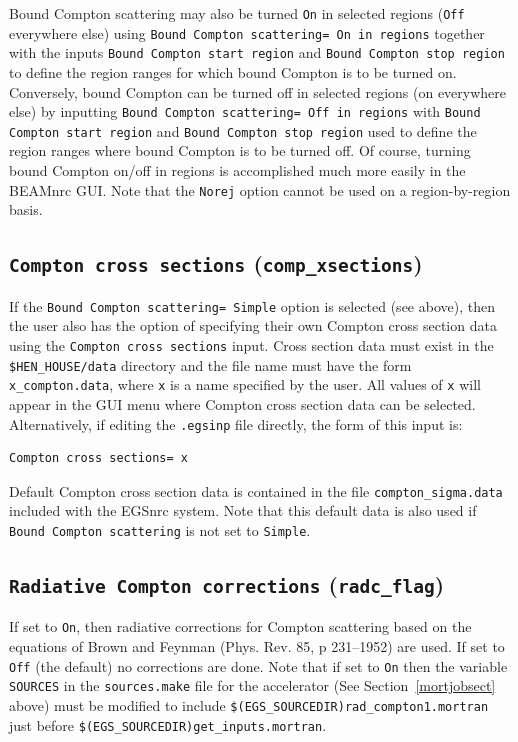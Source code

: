\documentclass[12pt,twoside]{article}
\begin{document}
Bound Compton scattering may also be turned {\tt On} in selected regions
({\tt Off} everywhere else) using
{\tt  Bound Compton scattering= On in regions} together with
the inputs {\tt Bound Compton start region} and {\tt Bound Compton stop region}
to define the region ranges for which bound Compton is to be turned on.
Conversely, bound Compton can be turned off in selected regions
(on everywhere else) by inputting
{\tt  Bound Compton scattering= Off in regions} with
{\tt Bound Compton start region} and {\tt Bound Compton stop region} used
to define the region ranges where bound Compton is to be turned off.  Of
course, turning bound Compton on/off in regions is accomplished much more
easily in the BEAMnrc GUI.  Note that the {\tt Norej} option cannot be
used on a region-by-region basis.

\subsection{ {\tt Compton cross sections} ({\tt comp\_xsections})}

If the {\tt Bound Compton scattering= Simple} option is selected (see above), then
the user also has the option of
specifying their own Compton cross section data
using the {\tt Compton cross sections} input.  Cross section data must exist
in the {\tt \$HEN\_HOUSE/data} directory and the file name must have
the form {\tt x\_compton.data}, where {\tt x} is a name
specified by the user.  All values of {\tt x} will appear in the GUI menu where Compton
cross section data can be selected.  Alternatively, if editing
the {\tt .egsinp} file directly, the form of this input is:
\begin{verbatim}
Compton cross sections= x
\end{verbatim}
Default Compton cross section
data is contained in the file {\tt compton\_sigma.data} included with
the EGSnrc system. Note that this default data is also used
if {\tt Bound Compton scattering} is not set to {\tt Simple}.

\subsection{{\tt Radiative Compton corrections} ({\tt radc\_flag})}

If set to {\tt On}, then radiative
corrections for Compton scattering based on the equations
of Brown and Feynman (Phys. Rev. 85, p 231--1952) are used.
If set to {\tt Off} (the default) no corrections are done.
Note that if set to {\tt On} then the variable {\tt SOURCES} in
the {\tt sources.make} file for the accelerator (See Section~\ref{mortjobsect} above)
must be modified to include {\tt \$(EGS\_SOURCEDIR)rad\_compton1.mortran} just
before {\tt \$(EGS\_SOURCEDIR)get\_inputs.mortran}.
\end{document}
